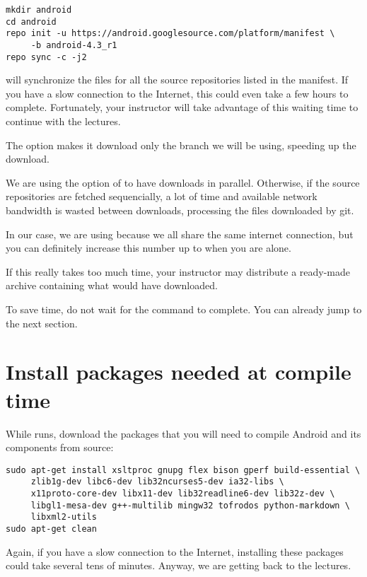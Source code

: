 \begin{verbatim}
mkdir android
cd android
repo init -u https://android.googlesource.com/platform/manifest \
     -b android-4.3_r1
repo sync -c -j2
\end{verbatim}

 will synchronize the files for all the source
repositories listed in the manifest. If you have a slow connection to
the Internet, this could even take a few hours to
complete. Fortunately, your instructor will take advantage of this
waiting time to continue with the lectures.

The  option makes it download only the branch we will be
using, speeding up the download.

We are using the  option of  to have 
downloads in parallel. Otherwise, if the source repositories are fetched
sequencially, a lot of time and available network bandwidth is wasted
between downloads, processing the files downloaded by git.

In our case, we are using  because we all share the same
internet connection, but you can definitely increase this number up to
\code{8} when you are alone.

If this really takes too much time, your instructor may distribute a
ready-made archive containing what \code{repo sync} would have
downloaded.

To save time, do not wait for the  command to
complete. You can already jump to the next section.

\section{Install packages needed at compile time}

While  runs, download the packages that you will need
to compile Android and its components from source:

\begin{verbatim}
sudo apt-get install xsltproc gnupg flex bison gperf build-essential \
     zlib1g-dev libc6-dev lib32ncurses5-dev ia32-libs \
     x11proto-core-dev libx11-dev lib32readline6-dev lib32z-dev \
     libgl1-mesa-dev g++-multilib mingw32 tofrodos python-markdown \
     libxml2-utils
sudo apt-get clean
\end{verbatim}

Again, if you have a slow connection to the Internet, installing these
packages could take several tens of minutes. Anyway, we are getting
back to the lectures.

